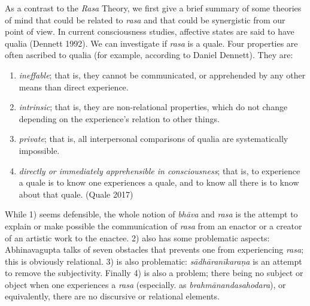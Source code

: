 As a contrast to the \textsl{Rasa} Theory, we first give a brief summary of some theories of mind that could be related to \textsl{rasa} and that could be synergistic from our point of view. In current consciousness studies, affective states are said to have qualia (Dennett 1992). We can investigate if \textsl{rasa} is a quale. Four properties are often ascribed to qualia (for example, according to Daniel Dennett). They are:
\begin{enumerate}
\item \textsl{ineffable}; that is, they cannot be communicated, or apprehended by any other means than direct experience.
\item \textsl{intrinsic}; that is, they are non-relational properties, which do not change depending on the experience's relation to other things.
\item \textsl{private}; that is, all interpersonal comparisons of qualia are systematically impossible.
\item  \textsl{directly or immediately apprehensible in consciousness}; that is, to experience a quale is to know one experiences a quale, and to know all there is to know about that quale. (Quale 2017)
\end{enumerate}

While 1) seems defensible, the whole notion of \textsl{bhāva} and \textsl{rasa} is the attempt to explain or make possible the communication of \textsl{rasa} from an enactor or a creator of an artistic work to the enactee. 2) also has some problematic aspects: Abhinavagupta talks of seven obstacles that prevents one from experiencing \textsl{rasa}; this is obviously relational. 3) is also problematic: \textsl{sādhāranīkaraṇa} is an attempt to remove the subjectivity. Finally 4) is also a problem; there being no subject or object when one experiences a \textsl{rasa} (especially. as \textsl{brahmānandasahodara}), or equivalently, there are no discursive or relational elements.

